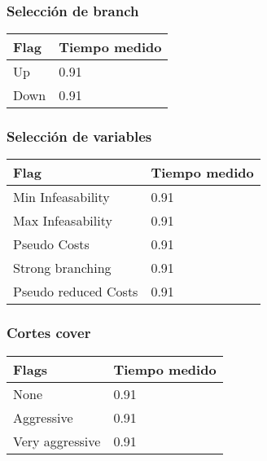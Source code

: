 \subsubsection{Selección de branch}

    \begin{center}
        \begin{tabular}{ | m{7em} | m{5cm} | }
        \hline
        Flag & Tiempo medido \\
        \hline
        Up & 0.91 \\
        \hline
        Down & 0.91 \\
        \hline
        \end{tabular}
    \end{center}

\subsubsection{Selección de variables}

    \begin{center}
        \begin{tabular}{ | m{11em} | m{5cm} | }
        \hline
        Flag & Tiempo medido \\
        \hline
        Min Infeasability & 0.91 \\
        \hline
        Max Infeasability & 0.91 \\
        \hline
        Pseudo Costs & 0.91 \\
        \hline
        Strong branching & 0.91 \\
        \hline
        Pseudo reduced Costs & 0.91 \\
        \hline
        \end{tabular}
    \end{center}

\subsubsection{Cortes cover}

    \begin{center}
        \begin{tabular}{ | m{7em} | m{5cm} | }
        \hline
        Flags  & Tiempo medido \\
        \hline
        None  & 0.91 \\
        \hline
        Aggressive  & 0.91 \\
        \hline
        Very aggressive  & 0.91 \\
        \hline
        \end{tabular}
    \end{center}

